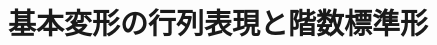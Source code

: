 \documentclass[../../topic_linear-algebra]{subfiles}
\begin{document}
\chapter{基本変形の行列表現と階数標準形}
\end{document}
